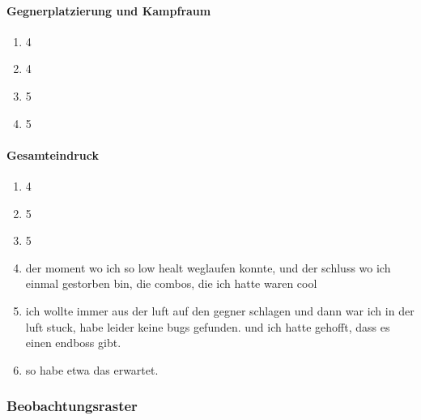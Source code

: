 \documentclass[../Main.tex]{subfiles}
\begin{document}
\paragraph{Gegnerplatzierung und Kampfraum}
\begin{enumerate}[label=\textbf{Q\arabic*}, leftmargin=1.5cm, itemsep=0.5em, resume]
    \item 4
    \item 4
    \item 5
    \item 5
\end{enumerate}

\paragraph{Gesamteindruck}
\begin{enumerate}[label=\textbf{Q\arabic*}, leftmargin=1.5cm, itemsep=0.5em, resume]
    \item 4
    \item 5
    \item 5
    \item der moment wo ich so low healt weglaufen konnte, und der schluss wo ich einmal gestorben bin, die combos, die ich hatte waren cool
    \item ich wollte immer aus der luft auf den gegner schlagen und dann war ich in der luft stuck, habe leider keine bugs gefunden. und ich hatte gehofft, dass es einen endboss gibt.
    \item so habe etwa das erwartet.
\end{enumerate}

\subsubsection{Beobachtungsraster}
\end{document}
